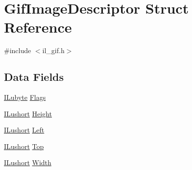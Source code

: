 \hypertarget{struct_gif_image_descriptor}{\section{Gif\-Image\-Descriptor Struct Reference}
\label{struct_gif_image_descriptor}
}


{\ttfamily \#include $<$il\-\_\-gif.\-h$>$}

\subsection*{Data Fields}
\begin{DoxyCompactItemize}
\item 
\hyperlink{il_8h_a8d2f04500100a86d1b00e98ab1b15a33}{I\-Lubyte} \hyperlink{struct_gif_image_descriptor_a4d4e57f611ec63d5199ee6ea1c56077e}{Flags}
\item 
\hyperlink{il_8h_af6287b43748354a7c4864da43ae56962}{I\-Lushort} \hyperlink{struct_gif_image_descriptor_ab74e2bb7cc7272180be796817440ae4e}{Height}
\item 
\hyperlink{il_8h_af6287b43748354a7c4864da43ae56962}{I\-Lushort} \hyperlink{struct_gif_image_descriptor_aa8de2fde7de4d37142ae5c72c8a320f7}{Left}
\item 
\hyperlink{il_8h_af6287b43748354a7c4864da43ae56962}{I\-Lushort} \hyperlink{struct_gif_image_descriptor_a8781a36554a66688b70b14f8261d701e}{Top}
\item 
\hyperlink{il_8h_af6287b43748354a7c4864da43ae56962}{I\-Lushort} \hyperlink{struct_gif_image_descriptor_aed0f0a923b8346ba51a4de45fff77ee7}{Width}
\end{DoxyCompactItemize}


